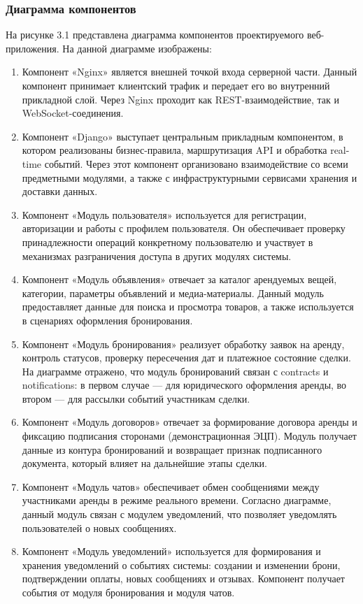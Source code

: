 \subsubsection{Диаграмма компонентов}
На рисунке 3.1 представлена диаграмма компонентов проектируемого веб-приложения. На данной диаграмме изображены:
\begin{enumerate}
    \item Компонент «Nginx» является внешней точкой входа серверной части. Данный компонент принимает клиентский трафик и передает его во внутренний прикладной слой. Через Nginx проходит как REST-взаимодействие, так и WebSocket-соединения. 
    \item Компонент «Django» выступает центральным прикладным компонентом, в котором реализованы бизнес-правила, маршрутизация API и обработка real-time событий. Через этот компонент организовано взаимодействие со всеми предметными модулями, а также с инфраструктурными сервисами хранения и доставки данных.
    \item Компонент «Модуль пользователя» используется для регистрации, авторизации и работы с профилем пользователя. Он обеспечивает проверку принадлежности операций конкретному пользователю и участвует в механизмах разграничения доступа в других модулях системы.
    \item Компонент «Модуль объявления» отвечает за каталог арендуемых вещей, категории, параметры объявлений и медиа-материалы. Данный модуль предоставляет данные для поиска и просмотра товаров, а также используется в сценариях оформления бронирования.
    \item Компонент «Модуль бронирования» реализует обработку заявок на аренду, контроль статусов, проверку пересечения дат и платежное состояние сделки. На диаграмме отражено, что модуль бронирований связан с contracts и notifications: в первом случае — для юридического оформления аренды, во втором — для рассылки событий участникам сделки.
    \item Компонент «Модуль договоров» отвечает за формирование договора аренды и фиксацию подписания сторонами (демонстрационная ЭЦП). Модуль получает данные из контура бронирований и возвращает признак подписанного документа, который влияет на дальнейшие этапы сделки.
    \item Компонент «Модуль чатов» обеспечивает обмен сообщениями между участниками аренды в режиме реального времени. Согласно диаграмме, данный модуль связан с модулем уведомлений, что позволяет уведомлять пользователей о новых сообщениях.
    \item Компонент «Модуль уведомлений» используется для формирования и хранения уведомлений о событиях системы: создании и изменении брони, подтверждении оплаты, новых сообщениях и отзывах. Компонент получает события от модуля бронирования и модуля чатов.

\end{enumerate}
